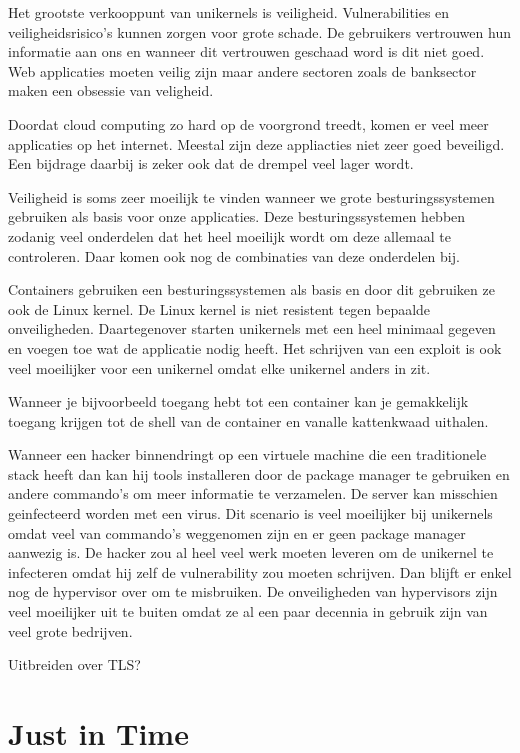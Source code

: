 \documentclass[pdftex,a4paper,12pt,twoside]{report}
\begin{document}
Het grootste verkooppunt van unikernels is veiligheid. Vulnerabilities en veiligheidsrisico's kunnen zorgen voor grote schade. De gebruikers vertrouwen hun informatie aan ons en wanneer dit vertrouwen geschaad word is dit niet goed. Web applicaties moeten veilig zijn maar andere sectoren zoals de banksector maken een obsessie van veligheid.

Doordat cloud computing zo hard op de voorgrond treedt, komen er veel meer applicaties op het internet. Meestal zijn deze appliacties niet zeer goed beveiligd. Een bijdrage daarbij is zeker ook dat de drempel veel lager wordt.

Veiligheid is soms zeer moeilijk te vinden wanneer we grote besturingssystemen gebruiken als basis voor onze applicaties. Deze besturingssystemen hebben zodanig veel onderdelen dat het heel moeilijk wordt om deze allemaal te controleren. Daar komen ook nog de combinaties van deze onderdelen bij.

Containers gebruiken een besturingssystemen als basis en door dit gebruiken ze ook de Linux kernel. De Linux kernel is niet resistent tegen bepaalde onveiligheden. Daartegenover starten unikernels met een heel minimaal gegeven en voegen toe wat de applicatie nodig heeft. Het schrijven van een exploit is ook veel moeilijker voor een unikernel omdat elke unikernel anders in zit.

Wanneer je bijvoorbeeld toegang hebt tot een container kan je gemakkelijk toegang krijgen tot de shell van de container en vanalle kattenkwaad uithalen.

Wanneer een hacker binnendringt op een virtuele machine die een traditionele stack heeft dan kan hij tools installeren door de package manager te gebruiken en andere commando's om meer informatie te verzamelen. De server kan misschien geinfecteerd worden met een virus. Dit scenario is veel moeilijker bij unikernels omdat veel van commando's weggenomen zijn en er geen package manager aanwezig is. De hacker zou al heel veel werk moeten leveren om de unikernel te infecteren omdat hij zelf de vulnerability zou moeten schrijven. Dan blijft er enkel nog de hypervisor over om te misbruiken. De onveiligheden van hypervisors zijn veel moeilijker uit te buiten omdat ze al een paar decennia in gebruik zijn van veel grote bedrijven.

Uitbreiden over TLS?

\section{Just in Time}
\end{document}
